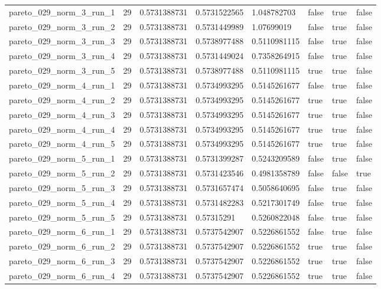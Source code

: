 \begin{tabular}{@{}llllllll@{}}
pareto\_029\_norm\_3\_run\_1 & 29 & 0.5731388731 & 0.5731522565 & 1.048782703 & false & true & false \\
pareto\_029\_norm\_3\_run\_2 & 29 & 0.5731388731 & 0.5731449989 & 1.07699019 & false & true & false \\
pareto\_029\_norm\_3\_run\_3 & 29 & 0.5731388731 & 0.5738977488 & 0.5110981115 & false & true & false \\
pareto\_029\_norm\_3\_run\_4 & 29 & 0.5731388731 & 0.5731449024 & 0.7358264915 & false & true & false \\
pareto\_029\_norm\_3\_run\_5 & 29 & 0.5731388731 & 0.5738977488 & 0.5110981115 & true & true & false \\
pareto\_029\_norm\_4\_run\_1 & 29 & 0.5731388731 & 0.5734993295 & 0.5145261677 & false & true & false \\
pareto\_029\_norm\_4\_run\_2 & 29 & 0.5731388731 & 0.5734993295 & 0.5145261677 & true & true & false \\
pareto\_029\_norm\_4\_run\_3 & 29 & 0.5731388731 & 0.5734993295 & 0.5145261677 & true & true & false \\
pareto\_029\_norm\_4\_run\_4 & 29 & 0.5731388731 & 0.5734993295 & 0.5145261677 & true & true & false \\
pareto\_029\_norm\_4\_run\_5 & 29 & 0.5731388731 & 0.5734993295 & 0.5145261677 & true & true & false \\
pareto\_029\_norm\_5\_run\_1 & 29 & 0.5731388731 & 0.5731399287 & 0.5243209589 & false & true & false \\
pareto\_029\_norm\_5\_run\_2 & 29 & 0.5731388731 & 0.5731423546 & 0.4981358789 & false & false & true \\
pareto\_029\_norm\_5\_run\_3 & 29 & 0.5731388731 & 0.5731657474 & 0.5058640695 & false & true & false \\
pareto\_029\_norm\_5\_run\_4 & 29 & 0.5731388731 & 0.5731482283 & 0.5217301749 & false & true & false \\
pareto\_029\_norm\_5\_run\_5 & 29 & 0.5731388731 & 0.57315291 & 0.5260822048 & false & true & false \\
pareto\_029\_norm\_6\_run\_1 & 29 & 0.5731388731 & 0.5737542907 & 0.5226861552 & false & true & false \\
pareto\_029\_norm\_6\_run\_2 & 29 & 0.5731388731 & 0.5737542907 & 0.5226861552 & true & true & false \\
pareto\_029\_norm\_6\_run\_3 & 29 & 0.5731388731 & 0.5737542907 & 0.5226861552 & true & true & false \\
pareto\_029\_norm\_6\_run\_4 & 29 & 0.5731388731 & 0.5737542907 & 0.5226861552 & true & true & false \\

\end{tabular}
